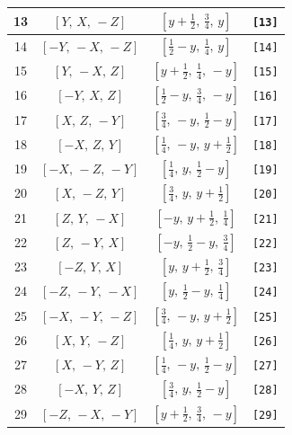 \documentclass[fleqn,8pt]{jsarticle}
\begin{document}
\begin{longtable}{cccc}
13 & $\left[ Y,\, X,\, - Z \right]$ & $\left[ y + \frac{1}{2},\, \frac{3}{4},\, y \right]$ & {\tt [13]} \\ \hline
14 & $\left[ - Y,\, - X,\, - Z \right]$ & $\left[ \frac{1}{2} - y,\, \frac{1}{4},\, y \right]$ & {\tt [14]} \\ \hline
15 & $\left[ Y,\, - X,\, Z \right]$ & $\left[ y + \frac{1}{2},\, \frac{1}{4},\, - y \right]$ & {\tt [15]} \\ \hline
16 & $\left[ - Y,\, X,\, Z \right]$ & $\left[ \frac{1}{2} - y,\, \frac{3}{4},\, - y \right]$ & {\tt [16]} \\ \hline
17 & $\left[ X,\, Z,\, - Y \right]$ & $\left[ \frac{3}{4},\, - y,\, \frac{1}{2} - y \right]$ & {\tt [17]} \\ \hline
18 & $\left[ - X,\, Z,\, Y \right]$ & $\left[ \frac{1}{4},\, - y,\, y + \frac{1}{2} \right]$ & {\tt [18]} \\ \hline
19 & $\left[ - X,\, - Z,\, - Y \right]$ & $\left[ \frac{1}{4},\, y,\, \frac{1}{2} - y \right]$ & {\tt [19]} \\ \hline
20 & $\left[ X,\, - Z,\, Y \right]$ & $\left[ \frac{3}{4},\, y,\, y + \frac{1}{2} \right]$ & {\tt [20]} \\ \hline
21 & $\left[ Z,\, Y,\, - X \right]$ & $\left[ - y,\, y + \frac{1}{2},\, \frac{1}{4} \right]$ & {\tt [21]} \\ \hline
22 & $\left[ Z,\, - Y,\, X \right]$ & $\left[ - y,\, \frac{1}{2} - y,\, \frac{3}{4} \right]$ & {\tt [22]} \\ \hline
23 & $\left[ - Z,\, Y,\, X \right]$ & $\left[ y,\, y + \frac{1}{2},\, \frac{3}{4} \right]$ & {\tt [23]} \\ \hline
24 & $\left[ - Z,\, - Y,\, - X \right]$ & $\left[ y,\, \frac{1}{2} - y,\, \frac{1}{4} \right]$ & {\tt [24]} \\ \hline
25 & $\left[ - X,\, - Y,\, - Z \right]$ & $\left[ \frac{3}{4},\, - y,\, y + \frac{1}{2} \right]$ & {\tt [25]} \\ \hline
26 & $\left[ X,\, Y,\, - Z \right]$ & $\left[ \frac{1}{4},\, y,\, y + \frac{1}{2} \right]$ & {\tt [26]} \\ \hline
27 & $\left[ X,\, - Y,\, Z \right]$ & $\left[ \frac{1}{4},\, - y,\, \frac{1}{2} - y \right]$ & {\tt [27]} \\ \hline
28 & $\left[ - X,\, Y,\, Z \right]$ & $\left[ \frac{3}{4},\, y,\, \frac{1}{2} - y \right]$ & {\tt [28]} \\ \hline
29 & $\left[ - Z,\, - X,\, - Y \right]$ & $\left[ y + \frac{1}{2},\, \frac{3}{4},\, - y \right]$ & {\tt [29]} \\ \hline

\end{longtable}
\end{document}
